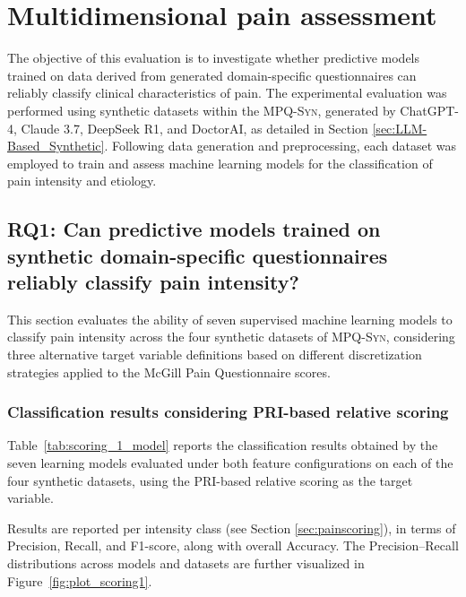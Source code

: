 \documentclass[preprint,12pt,authoryear]{elsarticle}
\newcommand{\dbsuite}{\small\textsc{MPQ-Syn}\xspace}
\begin{document}
\section{Multidimensional pain assessment\label{sec:sec8}}
The objective of this evaluation is to investigate whether predictive models trained on data derived from generated domain-specific questionnaires can reliably classify clinical characteristics of pain. The experimental evaluation was performed using synthetic datasets within the \dbsuite, generated by ChatGPT-4, Claude 3.7, DeepSeek R1, and DoctorAI, as detailed in Section \ref{sec:LLM-Based_Synthetic}. Following data generation and preprocessing, each dataset was employed to train and assess machine learning models for the classification of pain intensity and etiology.

\subsection{RQ1: Can predictive models trained on synthetic domain-specific questionnaires reliably classify pain intensity?}

This section evaluates the ability of seven supervised machine learning models to classify pain intensity across the four synthetic datasets of \dbsuite, considering three alternative target variable definitions based on different discretization strategies applied to the McGill Pain Questionnaire scores.

\subsubsection{Classification results considering PRI-based relative scoring}
Table~\ref{tab:scoring_1_model} reports the classification results obtained by the seven learning models evaluated under both feature configurations on each of the four synthetic datasets, using the PRI-based relative scoring as the target variable.

Results are reported per intensity class (see Section \ref{sec:painscoring}), in terms of Precision, Recall, and F1-score, along with overall Accuracy. The Precision–Recall distributions across models and datasets are further visualized in Figure~\ref{fig:plot_scoring1}.
\end{document}
